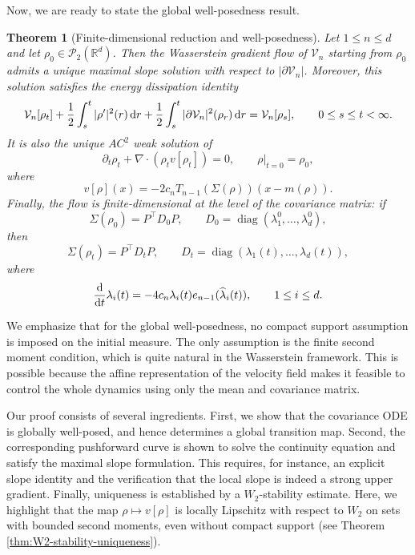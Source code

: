 \documentclass[11pt,reqno]{amsart}
\numberwithin{figure}{section}
\def\d {{\partial}}
\def\d{\mathrm{d}}
\renewcommand{\d}{  {\textup{d}} }
\newtheorem{theorem}{Theorem}[section]
\begin{document}
Now, we are ready to state the global well-posedness result. 

 \begin{theorem}[Finite-dimensional reduction and well-posedness]
	\label{thm:wellposed-reduction}
	Let $1\le n\le d$ and let $\rho_0\in\mathcal P_2(\mathbb R^d)$. Then the
	Wasserstein gradient flow of $\mathcal V_n$ starting from $\rho_0$ admits a unique
	maximal slope solution with respect to $|\partial \mathcal V_n|$. Moreover, this
	solution satisfies the energy dissipation identity
	\[
	\mathcal V_n[\rho_t]
	+
	\frac12\int_s^t |\rho'|^2(r)\,\d r
	+
	\frac12\int_s^t |\partial \mathcal V_n|^2(\rho_r)\,\d r
	=
	\mathcal V_n[\rho_s],
	\qquad
	0\le s\le t<\infty.
	\]
	It is also the unique $AC^2$ weak solution of
	\[
	\partial_t\rho_t+\nabla\cdot(\rho_t v[\rho_t])=0,
	\qquad
	\rho|_{t=0}=\rho_0,
	\]
	where
	\[
	v[\rho](x)
	=
	-2c_nT_{n-1}(\Sigma(\rho))(x-m(\rho)).
	\]
Finally, the flow is finite-dimensional at the level of the covariance
	matrix: if
	\[
	\Sigma(\rho_0)=P^\top D_0P,
	\qquad
	D_0=\operatorname{diag}(\lambda_1^0,\dots,\lambda_d^0),
	\]
	then
	\[
	\Sigma(\rho_t)=P^\top D_tP,
	\qquad
	D_t=\operatorname{diag}(\lambda_1(t),\dots,\lambda_d(t)),
	\]
	where
	\[
	\frac{\d}{\d t}\lambda_i(t)
	=
	-4c_n\lambda_i(t)e_{n-1}(\widehat\lambda_i(t)),
	\qquad
	1\le i\le d.
	\]
\end{theorem}

We emphasize that for the global well-posedness, no compact support assumption is imposed on the initial measure. The only assumption is the finite second moment condition, which is quite natural in the Wasserstein framework. This is possible because the affine representation of the velocity field makes it feasible to control the whole dynamics using only the mean and covariance matrix. 

Our proof consists of several ingredients. First, we show that the covariance ODE is globally well-posed, and hence determines a global transition map. Second, the corresponding pushforward curve is shown to solve the continuity equation and satisfy the maximal slope formulation. This requires, for instance, an explicit slope identity and the verification that the local slope is indeed a strong upper gradient. Finally, uniqueness is established by a $W_2$-stability estimate. Here,  we highlight that the map $\rho\mapsto   v[\rho]$ is locally Lipschitz with respect to $W_2$ on sets with bounded second moments, even without compact support (see Theorem \ref{thm:W2-stability-uniqueness}).
\end{document}
